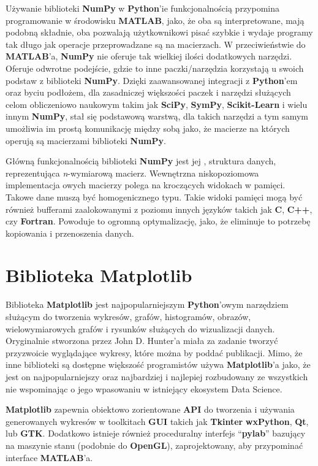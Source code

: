 Używanie biblioteki \textbf{NumPy} w \textbf{Python}'ie funkcjonalnością przypomina programowanie w środowisku \textbf{MATLAB}, jako, że oba są interpretowane, mają podobną składnie, oba pozwalają użytkownikowi pisać szybkie i wydaje programy tak długo jak operacje przeprowadzane są na macierzach. W przeciwieństwie do \textbf{MATLAB}'a, \textbf{NumPy} nie oferuje tak wielkiej ilości dodatkowych narzędzi. Oferuje odwrotne podejście, gdzie to inne paczki/narzędzia korzystają u swoich podstaw z biblioteki \textbf{NumPy}. Dzięki zaawansowanej integracji z \textbf{Python}'em oraz byciu podłożem, dla zasadniczej większości paczek i narzędzi służących celom obliczeniowo naukowym takim jak \textbf{SciPy}, \textbf{SymPy}, \textbf{Scikit-Learn} i wielu innym \textbf{NumPy}, stał się podstawową warstwą, dla takich narzędzi a tym samym umożliwia im prostą komunikację między sobą jako, że macierze na których operują są macierzami biblioteki \textbf{NumPy}.

Główną funkcjonalnością biblioteki \textbf{NumPy} jest jej , struktura danych, reprezentująca \textit{n}-wymiarową macierz. Wewnętrzna niskopoziomowa implementacja owych macierzy polega na kroczących widokach w pamięci. Takowe dane muszą być homogenicznego typu. Takie widoki pamięci mogą być również bufferami zaalokowanymi z poziomu innych języków takich jak \textbf{C}, \textbf{C++}, czy \textbf{Fortran}. Powoduje to ogromną optymalizację, jako, że eliminuje to potrzebę kopiowania i przenoszenia danych.



\section{Biblioteka Matplotlib}

Biblioteka \textbf{Matplotlib} \cite{MatplotlibDocumentation} \cite{Matplotlib30Cookbook} \cite{PythonForDataAnalysis} \cite{WikipediaMatplotlib} jest najpopularniejszym \textbf{Python}'owym narzędziem służącym do tworzenia wykresów, grafów, histogramów, obrazów, wielowymiarowych grafów i rysunków służących do wizualizacji danych. Oryginalnie stworzona przez John D. Hunter'a miała za zadanie tworzyć przyzwoicie wyglądające wykresy, które można by poddać publikacji. Mimo, że inne biblioteki są dostępne większość programistów używa \textbf{Matplotlib}'a jako, że jest on najpopularniejszy oraz najbardziej i najlepiej rozbudowany ze wszystkich nie wspominając o jego wpasowaniu w istniejący ekosystem Data Science.

\textbf{Matplotlib} zapewnia obiektowo zorientowane \textbf{API} do tworzenia i używania generowanych wykresów w toolkitach \textbf{GUI} takich jak \textbf{Tkinter} \textbf{wxPython}, \textbf{Qt}, lub \textbf{GTK}. Dodatkowo istnieje również proceduralny interfejs ``\textbf{pylab}'' bazujący na maszynie stanu (podobnie do \textbf{OpenGL}), zaprojektowany, aby przypominać interface \textbf{MATLAB}'a.

